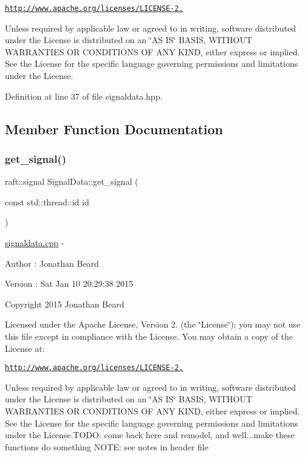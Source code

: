 \href{http://www.apache.org/licenses/LICENSE-2.0}{\tt http\+://www.\+apache.\+org/licenses/\+L\+I\+C\+E\+N\+S\+E-\/2.}

Unless required by applicable law or agreed to in writing, software distributed under the License is distributed on an \char`\"{}\+A\+S I\+S\char`\"{} B\+A\+S\+IS, W\+I\+T\+H\+O\+UT W\+A\+R\+R\+A\+N\+T\+I\+ES OR C\+O\+N\+D\+I\+T\+I\+O\+NS OF A\+NY K\+I\+ND, either express or implied. See the License for the specific language governing permissions and limitations under the License. 

Definition at line 37 of file signaldata.\+hpp.



\subsection{Member Function Documentation}
\hypertarget{class_signal_data_a565e9b24fa291fffacf3182a60b95bbf}{}\label{class_signal_data_a565e9b24fa291fffacf3182a60b95bbf} 
\subsubsection{\texorpdfstring{get\+\_\+signal()}{get\_signal()}}
{\footnotesize\ttfamily raft\+::signal Signal\+Data\+::get\+\_\+signal (\begin{DoxyParamCaption}\item[{const std\+::thread\+::id}]{id }\end{DoxyParamCaption})}

\hyperlink{signaldata_8cpp_source}{signaldata.\+cpp} -\/ \begin{DoxyAuthor}{Author}
\+: Jonathan Beard 
\end{DoxyAuthor}
\begin{DoxyVersion}{Version}
\+: Sat Jan 10 20\+:29\+:38 2015
\end{DoxyVersion}
Copyright 2015 Jonathan Beard

Licensed under the Apache License, Version 2. (the \char`\"{}\+License\char`\"{}); you may not use this file except in compliance with the License. You may obtain a copy of the License at\+:

\href{http://www.apache.org/licenses/LICENSE-2.0}{\tt http\+://www.\+apache.\+org/licenses/\+L\+I\+C\+E\+N\+S\+E-\/2.}

Unless required by applicable law or agreed to in writing, software distributed under the License is distributed on an \char`\"{}\+A\+S I\+S\char`\"{} B\+A\+S\+IS, W\+I\+T\+H\+O\+UT W\+A\+R\+R\+A\+N\+T\+I\+ES OR C\+O\+N\+D\+I\+T\+I\+O\+NS OF A\+NY K\+I\+ND, either express or implied. See the License for the specific language governing permissions and limitations under the License.\+T\+O\+DO\+: come back here and remodel, and well...make these functions do something N\+O\+TE\+: see notes in header file 

